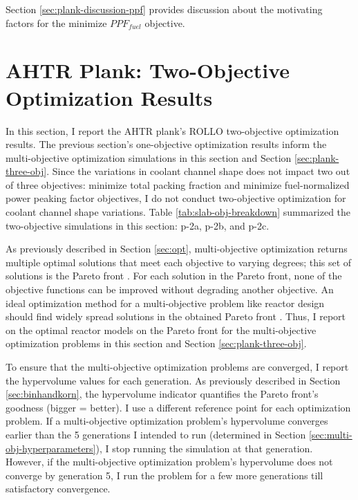 Section \ref{sec:plank-discussion-ppf} provides discussion about the motivating factors 
for the minimize $PPF_{fuel}$ objective. 


\pagebreak
\section{AHTR Plank: Two-Objective Optimization Results}
In this section, I report the \gls{AHTR} plank's \gls{ROLLO} two-objective 
optimization results. 
The previous section's one-objective optimization results inform the multi-objective 
optimization simulations in this section and Section \ref{sec:plank-three-obj}.
Since the variations in coolant channel shape does not impact two out of three objectives: 
minimize total packing fraction and minimize fuel-normalized power peaking factor 
objectives, I do not conduct two-objective optimization for coolant channel shape 
variations.  
Table \ref{tab:slab-obj-breakdown} summarized the two-objective simulations in this 
section: p-2a, p-2b, and p-2c.

As previously described in Section \ref{sec:opt}, multi-objective optimization returns 
multiple optimal solutions that meet each objective to varying degrees; this set of 
solutions is the Pareto front \cite{deb_multi-objective_2001}. 
For each solution in the Pareto front, none of the objective functions can be 
improved without degrading another objective.
An ideal optimization method for a multi-objective problem like reactor design 
should find widely spread solutions in the obtained Pareto front 
\cite{deb_multi-objective_2001}. 
Thus, I report on the optimal reactor models on the Pareto front for the multi-objective 
optimization problems in this section and Section \ref{sec:plank-three-obj}. 

To ensure that the multi-objective optimization problems are converged, I report the 
hypervolume values for each generation. 
As previously described in Section \ref{sec:binhandkorn}, the hypervolume indicator 
quantifies the Pareto front's goodness (bigger = better).
I use a different reference point for each optimization problem. 
If a multi-objective optimization problem's hypervolume converges earlier than the 
5 generations I intended to run (determined in Section 
\ref{sec:multi-obj-hyperparameters}), I stop running the simulation at that generation. 
However, if the multi-objective optimization problem's hypervolume does not converge by 
generation 5, I run the problem for a few more generations till satisfactory convergence.

